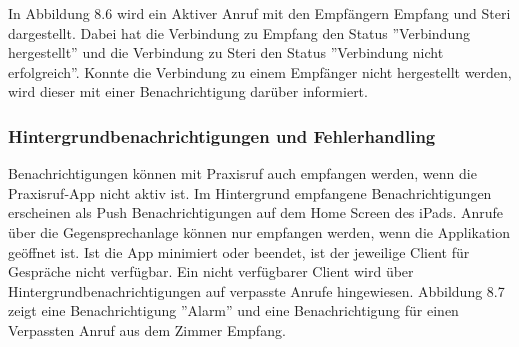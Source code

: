 In Abbildung 8.6 wird ein Aktiver Anruf mit den Empfängern Empfang und Steri dargestellt.
Dabei hat die Verbindung zu Empfang den Status ''Verbindung hergestellt'' und die Verbindung zu Steri den Status ''Verbindung nicht erfolgreich''.
Konnte die Verbindung zu einem Empfänger nicht hergestellt werden, wird dieser mit einer Benachrichtigung darüber informiert.

\clearpage

\subsubsection*{Hintergrundbenachrichtigungen und Fehlerhandling}

Benachrichtigungen können mit Praxisruf auch empfangen werden, wenn die Praxisruf-App nicht aktiv ist.
Im Hintergrund empfangene Benachrichtigungen erscheinen als Push Benachrichtigungen auf dem Home Screen des iPads.
Anrufe über die Gegensprechanlage können nur empfangen werden, wenn die Applikation geöffnet ist.
Ist die App minimiert oder beendet, ist der jeweilige Client für Gespräche nicht verfügbar.
Ein nicht verfügbarer Client wird über Hintergrundbenachrichtigungen auf verpasste Anrufe hingewiesen.
Abbildung 8.7 zeigt eine Benachrichtigung ''Alarm'' und eine Benachrichtigung für einen Verpassten Anruf aus dem Zimmer Empfang.

